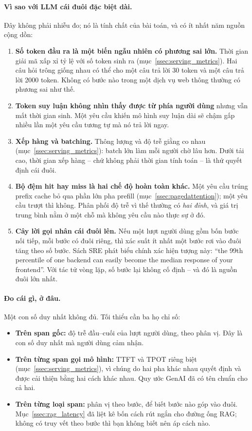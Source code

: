 \paragraph{Vì sao với LLM cái đuôi đặc biệt dài.} Đây không phải nhiễu đo; nó là tính chất của bài toán, và có ít nhất năm nguồn cộng dồn:

\begin{enumerate}
	\item \textbf{Số token đầu ra là một biến ngẫu nhiên có phương sai lớn.} Thời gian giải mã xấp xỉ tỷ lệ với số token sinh ra (mục~\ref{ssec:serving_metrics}). Hai câu hỏi trông giống nhau có thể cho một câu trả lời 30 token và một câu trả lời 2000 token. Không có bước nào trong một dịch vụ web thông thường có phương sai như thế.
	\item \textbf{Token suy luận không nhìn thấy được từ phía người dùng} nhưng vẫn mất thời gian sinh. Một yêu cầu khiến mô hình suy luận dài sẽ chậm gấp nhiều lần một yêu cầu tương tự mà nó trả lời ngay.
	\item \textbf{Xếp hàng và batching.} Thông lượng và độ trễ giằng co nhau (mục~\ref{ssec:serving_metrics}): batch lớn làm mỗi người chờ lâu hơn. Dưới tải cao, thời gian xếp hàng -- chứ không phải thời gian tính toán -- là thứ quyết định cái đuôi.
	\item \textbf{Bộ đệm hit hay miss là hai chế độ hoàn toàn khác.} Một yêu cầu trúng prefix cache bỏ qua phần lớn pha prefill (mục~\ref{ssec:pagedattention}); một yêu cầu trượt thì không. Phân phối độ trễ vì thế thường có \emph{hai đỉnh}, và giá trị trung bình nằm ở một chỗ mà không yêu cầu nào thực sự ở đó.
	\item \textbf{Cây lời gọi nhân cái đuôi lên.} Nếu một lượt người dùng gồm bốn bước nối tiếp, mỗi bước có đuôi riêng, thì xác suất ít nhất một bước rơi vào đuôi tăng theo số bước. Sách SRE phát biểu chính xác hiện tượng này: ``the 99th percentile of one backend can easily become the median response of your frontend''. Với tác tử vòng lặp, số bước lại không cố định -- và đó là nguồn đuôi lớn nhất.
\end{enumerate}

\paragraph{Đo cái gì, ở đâu.} Một con số duy nhất không đủ. Tối thiểu cần ba họ chỉ số:

\begin{itemize}
	\item \textbf{Trên span gốc:} độ trễ đầu--cuối của lượt người dùng, theo phân vị. Đây là con số duy nhất mà người dùng cảm nhận.
	\item \textbf{Trên từng span gọi mô hình:} TTFT và TPOT riêng biệt (mục~\ref{ssec:serving_metrics}), vì chúng do hai pha khác nhau quyết định và được cải thiện bằng hai cách khác nhau. Quy ước GenAI đã có tên chuẩn cho cả hai.
	\item \textbf{Trên từng loại span:} phân vị theo bước, để biết bước nào góp vào đuôi. Mục~\ref{ssec:rag_latency} đã liệt kê bốn cách rút ngắn cho đường ống RAG; không có truy vết theo bước thì bạn không biết nên áp cách nào.
\end{itemize}

